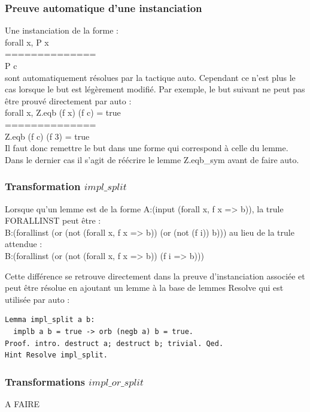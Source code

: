 \documentclass[11pt]{article}
\begin{document}
\subsubsection{Preuve automatique d'une instanciation}

Une instanciation de la forme :\\
forall x, P x \\
==============\\
P c \\
sont automatiquement résolues par la tactique auto. Cependant ce n'est plus le cas lorsque le but est légèrement modifié. Par exemple, le but suivant ne peut pas être prouvé directement par auto : \\
forall x, Z.eqb (f x) (f c) = true \\
==============\\
Z.eqb (f c) (f 3) = true \\

Il faut donc remettre le but dans une forme qui correspond à celle du lemme. Dans le dernier cas il s'agit de réécrire le lemme Z.eqb\_sym avant de faire auto.

\subsubsection{Transformation $impl\_split$}

Lorsque qu'un lemme est de la forme A:(input (forall x, f x => b)), la trule FORALLINST peut être :\\
B:(forallinst (or (not (forall x, f x => b)) (or (not (f i)) b)))
au lieu de la trule attendue : \\
B:(forallinst (or (not (forall x, f x => b)) (f i => b)))

Cette différence se retrouve directement dans la preuve d'instanciation associée et peut être résolue en ajoutant un lemme à la base de lemmes Resolve qui est utilisée par auto :

\begin{lstlisting}[frame=single]
Lemma impl_split a b:
  implb a b = true -> orb (negb a) b = true.
Proof. intro. destruct a; destruct b; trivial. Qed.
Hint Resolve impl_split.
\end{lstlisting}

\subsubsection{Transformations $impl\_or\_split$}

A FAIRE
\end{document}
